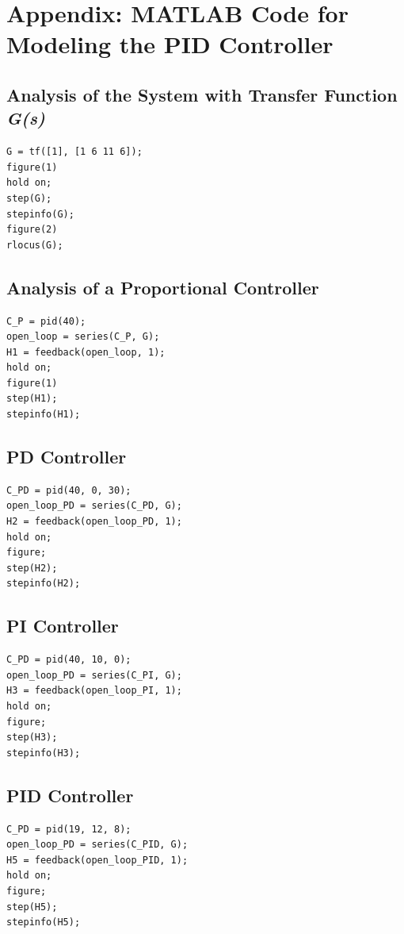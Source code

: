 \documentclass[a4paper, twocolumn, titlepage, 10pt]{article}
\begin{document}
	\section{Appendix: MATLAB Code for Modeling the PID Controller}
		\subsection{Analysis of the System with Transfer Function \textit{G(s)}}
			\begin{lstlisting}[frame=single, numbers=none]
G = tf([1], [1 6 11 6]);
figure(1)
hold on;
step(G);
stepinfo(G);
figure(2)
rlocus(G);
			\end{lstlisting}
		\subsection{Analysis of a Proportional Controller}
			\begin{lstlisting}[frame=single, numbers=none]
C_P = pid(40);
open_loop = series(C_P, G);
H1 = feedback(open_loop, 1);
hold on;
figure(1)
step(H1);
stepinfo(H1);
			\end{lstlisting}
		\subsection{PD Controller}
			\begin{lstlisting}[frame=single, numbers=none]
C_PD = pid(40, 0, 30);
open_loop_PD = series(C_PD, G);
H2 = feedback(open_loop_PD, 1);
hold on;
figure;
step(H2);
stepinfo(H2);
			\end{lstlisting}
		\subsection{PI Controller}
			\begin{lstlisting}[frame=single, numbers=none]
C_PD = pid(40, 10, 0);
open_loop_PD = series(C_PI, G);
H3 = feedback(open_loop_PI, 1);
hold on;
figure;
step(H3);
stepinfo(H3);
			\end{lstlisting}
		\subsection{PID Controller}
			\begin{lstlisting}[frame=single, numbers=none]
C_PD = pid(19, 12, 8);
open_loop_PD = series(C_PID, G);
H5 = feedback(open_loop_PID, 1);
hold on;
figure;
step(H5);
stepinfo(H5);
			\end{lstlisting}
\end{document}
